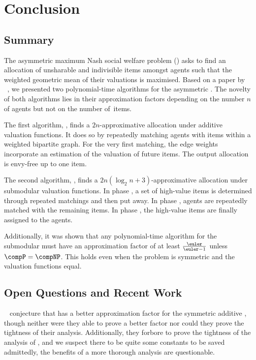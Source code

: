 \section{Conclusion}
\label{sec:conclusion}

\subsection{Summary}
\label{subsec:conclusion:summary}

The asymmetric maximum Nash social welfare problem (\NSW) asks to find an allocation of unsharable and indivisible items amongst agents such that the weighted geometric mean of their valuations is maximised.
Based on a paper by \citeauthor{APNSWuSVþUM}~\cite{APNSWuSVþUM}, we presented two polynomial-time algorithms for the asymmetric \NSW.
The novelty of both algorithms lies in their approximation factors depending on the number \(n\) of agents but not on the number of~items.

The first algorithm, \SMatch, finds a \(2n\)-approximative allocation under additive valuation functions.
It does so by repeatedly matching agents with items within a weighted bipartite graph.
For the very first matching, the edge weights incorporate an estimation of the valuation of future items.
The output allocation is envy-free up to one item.

The second algorithm, \RepReMatch, finds a \(2n(\log_2 n + 3)\)-approximative allocation under submodular valuation functions.
In phase \phasei, a set of high-value items is determined through repeated matchings and then put away.
In phase \phaseii, agents are repeatedly matched with the remaining items.
In phase \phaseiii, the high-value items are finally assigned to the agents.

Additionally, it was shown that any polynomial-time algorithm for the submodular \NSW{} must have an approximation factor of at least \(\frac{\euler}{\euler - 1}\) unless \(\compP = \compNP\).
This holds even when the problem is symmetric and the valuation functions equal.

\subsection{Open Questions and Recent Work}
\label{subsec:conclusion:outlook}

~\cite{APNSWuSVþUM} conjecture that \SMatch{} has a better approximation factor for the symmetric additive \NSW{}, though neither were they able to prove a better factor nor could they prove the tightness of their analysis.
Additionally, they forbore to prove the tightness of the analysis of \RepReMatch{}, and we suspect there to be quite some constants to be saved \Dash admittedly, the benefits of a more thorough analysis are questionable.

